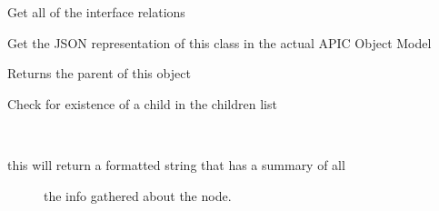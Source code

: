 \documentclass[letterpaper,10pt,english]{sphinxmanual}
\begin{document}
\begin{fulllineitems}

\begin{fulllineitems}
\label{acibaseobject:acibaseobject.BaseACIObject.get_interfaces}
Get all of the interface relations

\end{fulllineitems}


\begin{fulllineitems}
\label{acibaseobject:acibaseobject.BaseACIObject.get_json}
Get the JSON representation of this class in the actual APIC
Object Model

\end{fulllineitems}


\begin{fulllineitems}
\label{acibaseobject:acibaseobject.BaseACIObject.get_parent}
Returns the parent of this object

\end{fulllineitems}


\begin{fulllineitems}
\label{acibaseobject:acibaseobject.BaseACIObject.has_child}
Check for existence of a child in the children list

\end{fulllineitems}


\begin{fulllineitems}
\label{acibaseobject:acibaseobject.BaseACIObject.info}~\begin{description}
\item[{this will return a formatted string that has a summary of all}] \leavevmode
the info gathered about the node.

\end{description}


\end{fulllineitems}
\end{fulllineitems}
\end{document}
